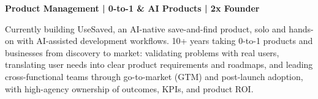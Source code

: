 \documentclass[11pt,a4paper,sans]{moderncv}
\begin{document}
\makecvtitle


\vspace{6pt}
\textbf{Product Management | 0-to-1 \& AI Products | 2x Founder}

\vspace{4pt}
\small{Currently building UseSaved, an AI-native save-and-find product, solo and hands-on with AI-assisted development workflows. 10+ years taking 0-to-1 products and businesses from discovery to market: validating problems with real users, translating user needs into clear product requirements and roadmaps, and leading cross-functional teams through go-to-market (GTM) and post-launch adoption, with high-agency ownership of outcomes, KPIs, and product ROI.}

\end{document}
